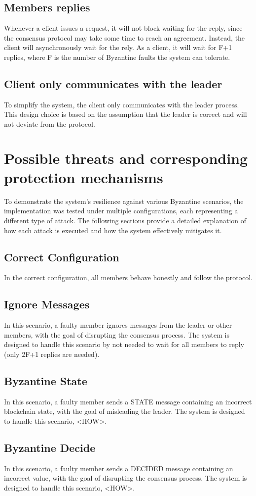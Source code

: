 \documentclass[runningheads]{llncs}
\begin{document}
\subsection{Members replies}
Whenever a client issues a request, it will not block waiting for the reply,
since the consensus protocol may take some time to reach an agreement. Instead,
the client will asynchronously wait for the rely. As a client, it will wait for 
F+1 replies, where F is the number of Byzantine faults the system can tolerate.
%
\subsection{Client only communicates with the leader}
To simplify the system, the client only communicates with the leader process.
This design choice is based on the assumption that the leader is correct and
will not deviate from the protocol.
%
\section{Possible threats and corresponding protection mechanisms} To
demonstrate the system's resilience against various Byzantine scenarios, the
implementation was tested under multiple configurations, each representing a
different type of attack. The following sections provide a detailed explanation
of how each attack is executed and how the system effectively mitigates it.
\subsection{Correct Configuration}
In the correct configuration, all members behave honestly and follow the
protocol.
%
\subsection{Ignore Messages}
In this scenario, a faulty member ignores messages from the leader or other
members, with the goal of disrupting the consensus process. The system is
designed to handle this scenario by not needed to wait for all members to reply
(only 2F+1 replies are needed).
%
\subsection{Byzantine State}
In this scenario, a faulty member sends a STATE message containing an incorrect
blockchain state, with the goal of misleading the leader. The system is designed
to handle this scenario, <HOW>.
%
\subsection{Byzantine Decide}
In this scenario, a faulty member sends a DECIDED message containing an
incorrect value, with the goal of disrupting the consensus process. The system
is designed to handle this scenario, <HOW>.
%
\end{document}
